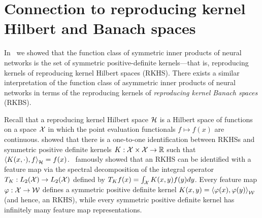 \section{Connection to reproducing kernel Hilbert and Banach spaces}\label{sec:rkbs_asymmetric_relations}

In~ we showed that the function class of symmetric inner products of neural networks is the set of symmetric positive-definite kernels---that is, reproducing kernels of reproducing kernel Hilbert spaces (RKHS). There exists a similar interpretation of the function class of asymmetric inner products of neural networks in terms of the reproducing kernels of \textit{reproducing kernel Banach spaces} (RKBS).

Recall that a reproducing kernel Hilbert space ${\mathcal{H}}$ is a Hilbert space of functions on a space ${\mathcal{X}}$ in which the point evaluation functionals $f \mapsto f(x)$ are continuous. \cite{aronszajn1950theory} showed that there is a one-to-one identification between RKHSs and symmetric positive definite kernels $K: {\mathcal{X}} \times {\mathcal{X}} \to \mathbb{R}$ such that $\left \langle K(x, \cdot), f \right\rangle_{\mathcal{H}} = f(x)$.~\cite{mercerFunctionsPositive1909} famously showed that an RKHS can be identified with a feature map via the spectral decomposition of the integral operator $T_K: L_2({\mathcal{X}}) \to L_2({\mathcal{X}})$ defined by $T_K f(x) = \int_{\mathcal{X}} K(x, y) f(y) dy$. Every feature map $\varphi: {\mathcal{X}} \to {\mathcal{W}}$ defines a symmetric positive definite kernel $K(x, y) = \left \langle \varphi(x), \varphi(y) \right\rangle_{\mathcal{W}}$ (and hence, an RKHS), while every symmetric positive definite kernel has infinitely many feature map representations.

